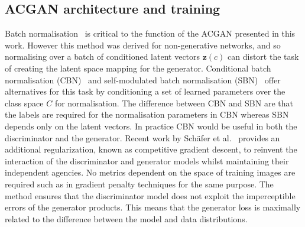 \documentclass[twocolumn]{article}
\numberwithin{equation}{section}
\begin{document}
\subsection{ACGAN architecture and training}
Batch normalisation~\cite{batchnorm} is critical to the function of the ACGAN presented in this work. However this method was derived for non-generative networks, and so normalising over a batch of conditioned latent vectors $\mathbf{z}(c)$ can distort the task of creating the latent space mapping for the generator. Conditional batch normalisation (CBN)~\cite{GAN_CBN} and self-modulated batch normalisation (SBN)~\cite{GAN_SBN} offer alternatives for this task by conditioning a set of learned parameters over the class space $C$ for normalisation. The difference between CBN and SBN are that the labels are required for the normalisation parameters in CBN whereas SBN depends only on the latent vectors. In practice CBN would be useful in both the discriminator and the generator.
Recent work by Sch\"{a}fer et al.~\cite{GAN_CGD1, GAN_CGD2} provides an additional regularization, known as competitive gradient descent, to reinvent the interaction of the discriminator and generator models whilst maintaining their independent agencies. No metrics dependent on the space of training images are required such as in gradient penalty techniques for the same purpose. The method ensures that the discriminator model does not exploit the imperceptible errors of the generator products. This means that the generator loss is maximally related to the difference between the model and data distributions.

\end{document}
